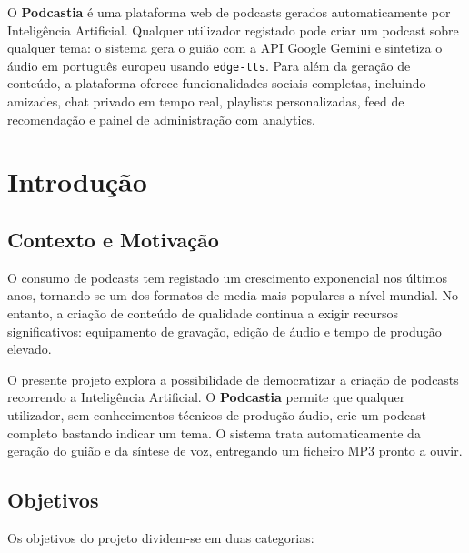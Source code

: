 \documentclass[12pt, a4paper]{report}
\begin{document}
\vfill

\begin{infobox}[title=Resumo]
O \textbf{Podcastia} é uma plataforma web de podcasts gerados automaticamente por
Inteligência Artificial. Qualquer utilizador registado pode criar um podcast sobre
qualquer tema: o sistema gera o guião com a API Google Gemini e sintetiza o áudio
em português europeu usando \texttt{edge-tts}. Para além da geração de conteúdo,
a plataforma oferece funcionalidades sociais completas, incluindo amizades, chat privado
em tempo real, playlists personalizadas, feed de recomendação e painel de
administração com analytics.
\end{infobox}

\newpage
\tableofcontents
\newpage

\chapter{Introdução}

\section{Contexto e Motivação}

O consumo de podcasts tem registado um crescimento exponencial nos últimos anos,
tornando-se um dos formatos de media mais populares a nível mundial. No entanto,
a criação de conteúdo de qualidade continua a exigir recursos significativos:
equipamento de gravação, edição de áudio e tempo de produção elevado.

O presente projeto explora a possibilidade de democratizar a criação de podcasts
recorrendo a Inteligência Artificial. O \textbf{Podcastia} permite que qualquer
utilizador, sem conhecimentos técnicos de produção áudio, crie um podcast completo
bastando indicar um tema. O sistema trata automaticamente da geração do guião e
da síntese de voz, entregando um ficheiro MP3 pronto a ouvir.

\section{Objetivos}

Os objetivos do projeto dividem-se em duas categorias:
\end{document}
